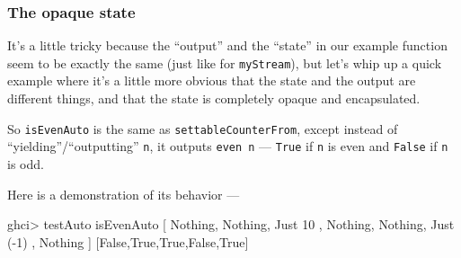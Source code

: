 \documentclass[]{article}
\newenvironment{Shaded}{}{}
\newcommand{\KeywordTok}[1]{\textcolor[rgb]{0.00,0.44,0.13}{\textbf{{#1}}}}
\newcommand{\DataTypeTok}[1]{\textcolor[rgb]{0.56,0.13,0.00}{{#1}}}
\newcommand{\DecValTok}[1]{\textcolor[rgb]{0.25,0.63,0.44}{{#1}}}
\newcommand{\CommentTok}[1]{\textcolor[rgb]{0.38,0.63,0.69}{\textit{{#1}}}}
\newcommand{\OtherTok}[1]{\textcolor[rgb]{0.00,0.44,0.13}{{#1}}}
\newcommand{\FunctionTok}[1]{\textcolor[rgb]{0.02,0.16,0.49}{{#1}}}
\newcommand{\NormalTok}[1]{{#1}}
\begin{document}
\subsubsection{The opaque state}\label{the-opaque-state}

It's a little tricky because the ``output'' and the ``state'' in our example
function seem to be exactly the same (just like for \texttt{myStream}), but
let's whip up a quick example where it's a little more obvious that the state
and the output are different things, and that the state is completely opaque and
encapsulated.

\begin{Shaded}
\end{Shaded}

So \texttt{isEvenAuto} is the same as \texttt{settableCounterFrom}, except
instead of ``yielding''/``outputting'' \texttt{n}, it outputs \texttt{even\ n}
--- \texttt{True} if \texttt{n} is even and \texttt{False} if \texttt{n} is odd.

Here is a demonstration of its behavior ---

\begin{Shaded}
\begin{Highlighting}[]
\NormalTok{ghci}\FunctionTok{>} \NormalTok{testAuto isEvenAuto  [ }\DataTypeTok{Nothing}\NormalTok{, }\DataTypeTok{Nothing}\NormalTok{, }\DataTypeTok{Just} \DecValTok{10}
                           \NormalTok{, }\DataTypeTok{Nothing}\NormalTok{, }\DataTypeTok{Nothing}\NormalTok{, }\DataTypeTok{Just} \NormalTok{(}\FunctionTok{-}\DecValTok{1}\NormalTok{)}
                           \NormalTok{, }\DataTypeTok{Nothing} \NormalTok{]}
\NormalTok{[}\DataTypeTok{False}\NormalTok{,}\DataTypeTok{True}\NormalTok{,}\DataTypeTok{True}\NormalTok{,}\DataTypeTok{False}\NormalTok{,}\DataTypeTok{True}\NormalTok{]}
\end{Highlighting}
\end{Shaded}
\end{document}
